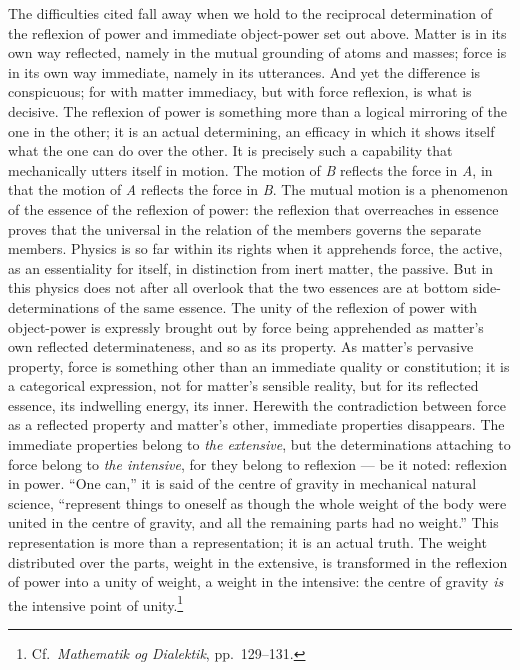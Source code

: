\documentclass[12pt,a4paper]{book}
\begin{document}
The difficulties cited fall away when we hold to the reciprocal determination of
the reflexion of power and immediate object-power set out above. Matter is in its
own way reflected, namely in the mutual grounding of atoms and masses; force is in
its own way
immediate, namely in its utterances. And yet the difference is conspicuous; for
with matter immediacy, but with force reflexion, is what is decisive. The reflexion
of power is something more than a logical mirroring of the one in the other; it is
an actual determining, an efficacy in which it shows itself what the one can do
over the other. It is precisely such a capability that mechanically utters itself in
motion. The motion of \textit{B} reflects the force in \textit{A}, in that the
motion of \textit{A} reflects the force in \textit{B}. The mutual motion is a
phenomenon of the essence of the reflexion of power: the reflexion that overreaches
in essence
proves that the universal in the relation of the members governs the separate
members. Physics is so far within its rights when it apprehends force, the active,
as an essentiality for itself, in distinction from inert matter, the passive. But
in this physics does not after all overlook that the two essences are at bottom
side-determinations of the same essence. The unity of the reflexion of power with
object-power is expressly brought out by force being apprehended as matter's own
reflected determinateness, and so as its property. As matter's pervasive property,
force is something other than an immediate quality or constitution; it is a
categorical expression, not for matter's sensible reality, but for its reflected
essence, its indwelling energy, its inner. Herewith the contradiction between force
as a reflected property and matter's other, immediate properties disappears. The
immediate properties belong to \emph{the extensive}, but the determinations
attaching to force belong to \emph{the intensive}, for they belong to reflexion ---
be it noted: reflexion in power. ``One can,'' it is said of the centre of gravity in
mechanical natural science, ``represent things to oneself as though the whole
weight of the body were united in the centre of gravity, and all the remaining parts
had no weight.'' This representation is more than a representation; it is an actual
truth. The weight distributed over the parts, weight in the extensive, is
transformed in the reflexion of power into a unity of weight, a weight in the
intensive: the centre of gravity \emph{is} the intensive point of
unity.\footnote{%
Cf.\ \textit{Mathematik og Dialektik}, pp.\ 129--131.}
\end{document}
